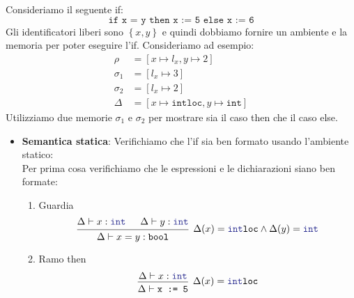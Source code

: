 \documentclass[a4paper]{article}
\begin{document}
\begin{example}
  \newcommand\ruleCol{Sepia}
  Consideriamo il seguente if:
  \[
    \texttt{if x = y then x := 5 else x := 6}
  \] 
  Gli identificatori liberi sono \( \left\{ x, y \right\} \) e quindi dobbiamo fornire
  un ambiente e la memoria per poter eseguire l'if. Consideriamo ad esempio:
  \[
    \begin{aligned}
      \rho &= \left[ x \mapsto l_x, y \mapsto 2 \right]\\
      \sigma_1 &= \left[ l_x \mapsto 3 \right]\\
      \sigma_2 &= \left[ l_x \mapsto 2 \right]\\
      \Delta &= \left[ x \mapsto \texttt{intloc}, y \mapsto \texttt{int} \right]
    \end{aligned}
  \] 
  Utilizziamo due memorie \( \sigma_1 \) e \( \sigma_2 \) per mostrare sia il caso
  then che il caso else.

  \begin{itemize}
    \item \textbf{Semantica statica}: Verifichiamo che l'if sia ben formato usando
      l'ambiente statico:\\
      Per prima cosa verifichiamo che le espressioni e le dichiarazioni siano ben formate:
      \begin{enumerate}
        \item Guardia
          \[
            \begin{prooftree}
              \hypo{ 
                \Delta \vdash x: \texttt{\textcolor{Blue}{int}}
              }
              \hypo{ 
                \Delta \vdash y: \texttt{\textcolor{Blue}{int}}
              }
              \infer2
              [\( 
              \Delta(x) = \texttt{\textcolor{Blue}{int}loc} \land \Delta(y) =
              \texttt{\textcolor{Blue}{int}}
              \)]
              { 
                \Delta \vdash x = y: \texttt{bool}
              }
            \end{prooftree}
          \] 

        \item Ramo then
          \[
            \begin{prooftree}
              \hypo{ 
                \Delta \vdash x: \texttt{\textcolor{Blue}{int}}
              }
              \infer1
              [\( 
                \Delta(x) = \texttt{\textcolor{Blue}{int}loc}
              \)]
              { 
                \Delta \vdash \texttt{x := 5}
              }
            \end{prooftree}
          \] 


\end{enumerate}
\end{itemize}
\end{example}
\end{document}
